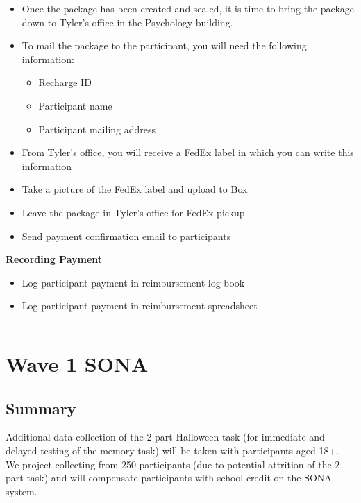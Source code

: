 \documentclass[]{book}
\providecommand{\tightlist}{%
  \setlength{\itemsep}{0pt}\setlength{\parskip}{0pt}}
\begin{document}
\begin{itemize}
\tightlist
\item
  Once the package has been created and sealed, it is time to bring the package down to Tyler's office in the Psychology building.
\item
  To mail the package to the participant, you will need the following information:

  \begin{itemize}
  \tightlist
  \item
    Recharge ID
  \item
    Participant name
  \item
    Participant mailing address
  \end{itemize}
\item
  From Tyler's office, you will receive a FedEx label in which you can write this information
\item
  Take a picture of the FedEx label and upload to Box
\item
  Leave the package in Tyler's office for FedEx pickup
\item
  Send payment confirmation email to participants
\end{itemize}

\textbf{Recording Payment}

\begin{itemize}
\tightlist
\item
  Log participant payment in reimbursement log book
\item
  Log participant payment in reimbursement spreadsheet
\end{itemize}

\begin{center}\rule{0.5\linewidth}{0.5pt}\end{center}

\hypertarget{wave-1-sona}{%
\chapter{Wave 1 SONA}\label{wave-1-sona}}

\hypertarget{summary}{%
\section{Summary}\label{summary}}

Additional data collection of the 2 part Halloween task (for immediate and delayed testing of the memory task) will be taken with participants aged 18+. We project collecting from 250 participants (due to potential attrition of the 2 part task) and will compensate participants with school credit on the SONA system.
\end{document}
